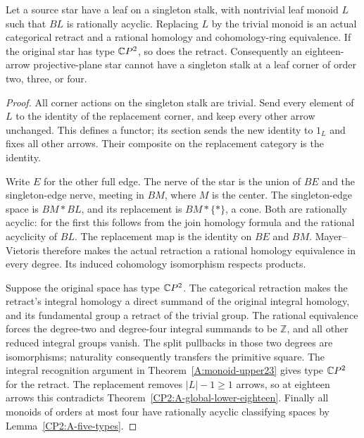 \begin{lemma}
\label{CP2:A-star-singleton-small-leaf-retract}
Let a source star have a leaf on a singleton stalk, with
nontrivial leaf monoid $L$ such that $BL$ is rationally acyclic.
Replacing $L$ by the trivial monoid is an actual categorical
retract and a rational homology and cohomology-ring equivalence.
If the original star has type $\mathbb{C}P^2$, so does the retract.
Consequently an eighteen-arrow projective-plane star cannot
have a singleton stalk at a leaf corner of order two, three,
or four.
\end{lemma}
\begin{proof}
All corner actions on the singleton stalk are trivial. Send
every element of $L$ to the identity of the replacement corner,
and keep every other arrow unchanged. This defines a functor;
its section sends the new identity to $1_L$ and fixes all
other arrows. Their composite on the replacement category is
the identity.

Write $E$ for the other full edge. The nerve of the star is
the union of $BE$ and the singleton-edge nerve, meeting in
$BM$, where $M$ is the center. The singleton-edge space is
$BM*BL$, and its replacement is $BM*\{*\}$, a cone. Both
are rationally acyclic: for the first this follows from the
join homology formula and the rational acyclicity of $BL$.
The replacement map is the identity on $BE$ and $BM$.
Mayer--Vietoris therefore makes the actual retraction a
rational homology equivalence in every degree. Its induced
cohomology isomorphism respects products.

Suppose the original space has type $\mathbb{C}P^2$. The categorical
retraction makes the retract's integral homology a direct
summand of the original integral homology, and its fundamental
group a retract of the trivial group. The rational equivalence
forces the degree-two and degree-four integral summands to be
$\mathbb Z$, and all other reduced integral groups vanish.
The split pullbacks in those two degrees are isomorphisms;
naturality consequently transfers the primitive square.
The integral recognition argument in
Theorem~\ref{A:monoid-upper23} gives type $\mathbb{C}P^2$ for the
retract. The replacement removes $|L|-1\geq1$ arrows, so at
eighteen arrows this contradicts
Theorem~\ref{CP2:A-global-lower-eighteen}.
Finally all monoids of orders at most four have rationally
acyclic classifying spaces by Lemma~\ref{CP2:A-five-types}.
\end{proof}

